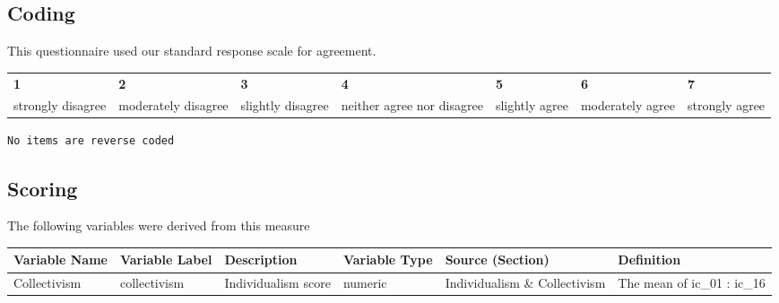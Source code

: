 \documentclass[
  letterpaper,
]{scrbook}
\begin{document}
\subsection*{Coding}\label{coding-3}

This questionnaire used our standard response scale for agreement.

\begin{longtable}[]{@{}
  >{\raggedright\arraybackslash}p{}
  >{\raggedright\arraybackslash}p{}
  >{\raggedright\arraybackslash}p{}
  >{\raggedright\arraybackslash}p{}
  >{\raggedright\arraybackslash}p{}
  >{\raggedright\arraybackslash}p{}
  >{\raggedright\arraybackslash}p{}@{}}
\toprule\noalign{}
\endhead
\bottomrule\noalign{}
\endlastfoot
\textbf{1} & \textbf{2} & \textbf{3} & \textbf{4} & \textbf{5} &
\textbf{6} & \textbf{7} \\
strongly disagree & moderately disagree & slightly disagree & neither
agree nor disagree & slightly agree & moderately agree & strongly
agree \\
\end{longtable}

\texttt{No\ items\ are\ reverse\ coded}

\subsection*{Scoring}\label{scoring-3}

The following variables were derived from this measure

\begin{tabu} to 
\toprule
Variable Name & Variable Label & Description & Variable Type & Source (Section) & Definition\\
\midrule
Collectivism & collectivism & Individualism score & numeric & Individualism \& Collectivism & The mean of ic\_01 : ic\_16\\
\bottomrule
\end{tabu}
\end{document}
